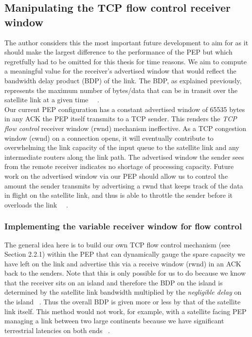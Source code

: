 \subsection{Manipulating the TCP flow control receiver window}

The author considers this the most important future development to aim for as it should make the largest difference to the performance of the PEP but which regretfully had to be omitted for this thesis for time reasons. We aim to compute a meaningful value for the receiver's advertised window that would reflect the bandwidth delay product (BDP) of the link. The BDP, as explained previously, represents the maximum number of bytes/data that can be in transit over the satellite link at a given time ~\cite{4}~\cite{13}. \\

Our current PEP configuration has a constant advertised window of 65535 bytes in any ACK the PEP itself transmits to a TCP sender. This renders the \emph{TCP flow control} receiver window (rwnd) mechanism ineffective. As a TCP congestion window (cwnd) on a connection opens, it will eventually contribute to overwhelming the link capacity of the input queue to the satellite link and any intermediate routers along the link path. The advertised window the sender sees from the remote receiver indicates no shortage of processing capacity. Future work on the advertised window via our PEP should allow us to control the amount the sender transmits by advertising a rwnd that keeps track of the data in flight on the satellite link, and thus is able to throttle the sender before it overloads the link ~\cite{17}~\cite{18}.

\subsubsection{Implementing the variable receiver window for flow control}
The general idea here is to build our own TCP flow control mechanism (see Section 2.2.1) within the PEP that can dynamically gauge the spare capacity we have left on the link and advertise this via a receive window (rwnd) in an ACK back to the senders. Note that this is only possible for us to do because we know that the receiver sits on an island and therefore the BDP on the island is determined by the satellite link bandwidth multiplied by the \emph{negligible delay} on the island ~\cite{4}. Thus the overall BDP is given more or less by that of the satellite link itself. This method would not work, for example,  with a satellite facing PEP managing a link between two large continents because we have significant terrestrial latencies on both ends ~\cite{5}.\\

